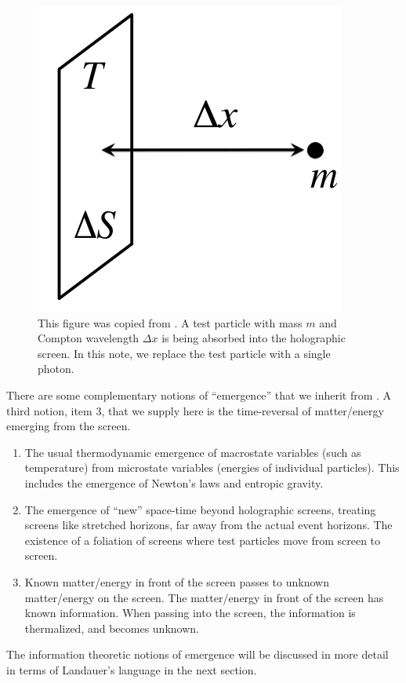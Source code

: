 \documentclass[12pt,a4paper]{article}
\begin{document}
\begin{figure}[h]
\centering
\includegraphics[scale=1.2]{screen.png}
\caption{This figure was copied from \cite{entropic}.  A test particle with mass $m$ and Compton wavelength $\Delta x$ is being absorbed into the holographic screen.  In this note, we replace the test particle with a single photon.}
\label{fig:x cubed graph}
\end{figure}
There are some complementary notions of ``emergence'' that we inherit from \cite{entropic}.  A third notion, item 3, that we supply here is the time-reversal of matter/energy emerging from the screen.
\begin{enumerate}
  \item The usual thermodynamic emergence of macrostate variables (such as temperature) from microstate variables (energies of individual particles).  This includes the emergence of Newton's laws and entropic gravity.
  \item The emergence of ``new'' space-time beyond holographic screens, treating screens like stretched horizons, far away from the actual event horizons.  The existence of a foliation of screens where test particles move from screen to screen.
  \item Known matter/energy in front of the screen passes to unknown matter/energy on the screen. The matter/energy in front of the screen has known information.  When passing into the screen, the information is thermalized, and becomes unknown.
\end{enumerate}
The information theoretic notions of emergence will be discussed in more detail in terms of Landauer's language in the next section.
\end{document}
